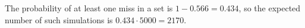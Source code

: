The probability of at least one miss in a set is $1-0.566=0.434$, so the expected number of such simulations is $0.434\cdot5000=\boxed{2170}$.
